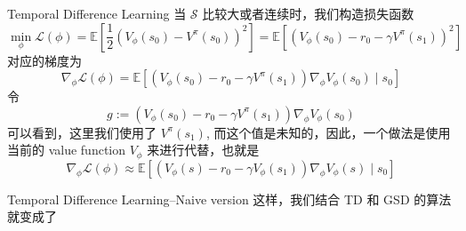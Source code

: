 \documentclass[aspectratio=169]{beamer}
\begin{document}
\begin{frame}{Temporal Difference Learning}
    当 $\mathcal{S}$ 比较大或者连续时，我们构造损失函数
    \begin{equation}
    \min_{\phi} \mathcal{L}(\phi) =\mathbb{E}\left[\frac12\left(V_\phi(s_0)-V^\pi(s_0)\right)^2\right]=\mathbb{E}\left[\left(V_\phi(s_0)- r_0-\gamma V^\pi(s_1)\right)^2\right]
    \end{equation}
    对应的梯度为
    \begin{equation}
    \nabla_\phi \mathcal{L}(\phi) =\mathbb{E}\left[\left(V_\phi(s_0)- r_0-\gamma \boxed{V^\pi(s_1)}\right)\nabla_\phi V_\phi(s_0)\mid s_0\right]
    \end{equation}
    令
    \begin{equation}
    g := \left(V_\phi(s_0)- r_0-\gamma \boxed{V^\pi(s_1)}\right)\nabla_\phi V_\phi(s_0)
    \end{equation}
    可以看到，这里我们使用了 $V^\pi(s_1)$, 而这个值是未知的，因此，一个做法是使用当前的 value function $V_\phi$ 来进行代替，也就是
    \begin{equation}
    \nabla_\phi \mathcal{L}(\phi) \approx \mathbb{E}\left[\left(V_\phi(s)- r_0-\gamma V_\phi(s_1)\right)\nabla_\phi V_\phi(s)\mid s_0\right]
    \end{equation}
\end{frame}

\begin{frame}{Temporal Difference Learning--Naive version}
    这样，我们结合 TD 和 GSD 的算法就变成了

    \begin{algorithm}[H]\label{algo:td-learning-naive-version}
        \caption{Value function approximation with TD (not correct)}
    \end{algorithm}
\end{frame}
\end{document}
